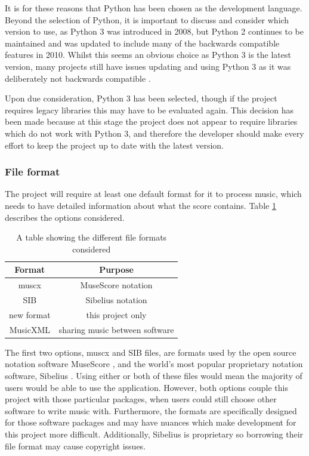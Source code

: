 It is for these reasons that Python has been chosen as the development language. Beyond the selection of Python, it is important to discuss and consider which version to use, as Python 3 was introduced in 2008, but Python 2 continues to be maintained and was updated to include many of the backwards compatible features in 2010. Whilst this seems an obvious choice as Python 3 is the latest version, many projects still have issues updating and using Python 3 as it was deliberately not backwards compatible \parencite{Foundation2}.

Upon due consideration, Python 3 has been selected, though if the project requires legacy libraries this may have to be evaluated again. This decision has been made because at this stage the project does not appear to require libraries which do not work with Python 3, and therefore the developer should make every effort to keep the project up to date with the latest version.

\subsubsection{File format}
The project will require at least one default format for it to process music, which needs to have detailed information about what the score contains. Table \ref{table:formats} describes the options considered.

\begin{table}[H]
\centering
\begin{tabular}{| c | c | } \hline
  {Format} & {Purpose} \\ \hline
  muscx & MuseScore notation \\ \hline
  SIB & Sibelius notation \\ \hline
  new format & this project only \\ \hline
  MusicXML & sharing music between software \\ \hline
\end{tabular}
\caption{A table showing the different file formats considered}
\label{table:formats}
\end{table}
The first two options, muscx and SIB files, are formats used by the open source notation software MuseScore \parencite{MuseTour}, and the world's most popular proprietary notation software, Sibelius \parencite{avid}. Using either or both of these files would mean the majority of users would be able to use the application. 
However, both options couple this project with those particular packages, when users could still choose other software to write music with. Furthermore, the formats are specifically designed for those software packages and may have nuances which make development for this project more difficult. Additionally, Sibelius is proprietary so borrowing their file format may cause copyright issues.

